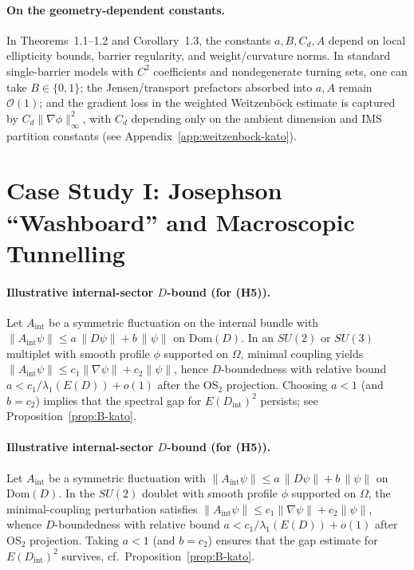 \documentclass[11pt]{article}
\theoremstyle{definition}
\begin{document}
\paragraph{On the geometry-dependent constants.} In Theorems~1.1--1.2 and Corollary~1.3, the constants $a,B,C_d,A$ depend on local ellipticity bounds, barrier regularity, and weight/curvature norms. In standard single-barrier models with $C^2$ coefficients and nondegenerate turning sets, one can take $B\in\{0,1\}$; the Jensen/transport prefactors absorbed into $a,A$ remain $\mathcal{O}(1)$; and the gradient loss in the weighted Weitzenb\"ock estimate is captured by $C_d\|\nabla\phi\|_\infty^2$, with $C_d$ depending only on the ambient dimension and IMS partition constants (see Appendix~\ref{app:weitzenbock-kato}).
\section{Case Study I: Josephson ``Washboard'' and Macroscopic Tunnelling}

\paragraph{Illustrative internal-sector $D$-bound (for (H5)).} Let $A_{\mathrm{int}}$ be a symmetric fluctuation on the internal bundle with $\|A_{\mathrm{int}}\psi\|\le a\,\|D\psi\|+b\,\|\psi\|$ on $\mathrm{Dom}(D)$. In an $SU(2)$ or $SU(3)$ multiplet with smooth profile $\phi$ supported on $\Omega$, minimal coupling yields $\|A_{\mathrm{int}}\psi\|\le c_1\|\nabla\psi\|+c_2\|\psi\|$, hence $D$-boundedness with relative bound $a<c_1/\lambda_1(E(D))+o(1)$ after the OS$_2$ projection. Choosing $a<1$ (and $b=c_2$) implies that the spectral gap for $E(D_{\mathrm{int}})^2$ persists; see Proposition~\ref{prop:B-kato}.
\paragraph{Illustrative internal-sector $D$-bound (for (H5)).} Let $A_{\mathrm{int}}$ be a symmetric fluctuation with $\|A_{\mathrm{int}}\psi\|\le a\,\|D\psi\|+b\,\|\psi\|$ on $\mathrm{Dom}(D)$. In the $SU(2)$ doublet with smooth profile $\phi$ supported on $\Omega$, the minimal-coupling perturbation satisfies $\|A_{\mathrm{int}}\psi\|\le c_1\|\nabla\psi\|+c_2\|\psi\|$, whence $D$-boundedness with relative bound $a<c_1/\lambda_1(E(D))+o(1)$ after OS$_2$ projection. Taking $a<1$ (and $b=c_2$) ensures that the gap estimate for $E(D_{\mathrm{int}})^2$ survives, cf.~Proposition~\ref{prop:B-kato}.
    \label{sec:washboard}
    
\end{document}
